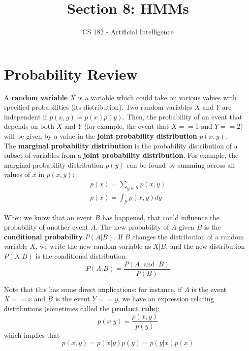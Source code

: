 \documentclass[a4paper]{article}
\title{Section 8: HMMs}
\author{CS 182 - Artificial Intelligence}
\date{}
\begin{document}
\maketitle

\section*{Probability Review}

A {\bf{random variable}} $X$ is a variable which could take on various values with specified probabilities (its distribution). Two random variables $X$ and $Y$ are independent if $p(x, y) = p(x)p(y)$. Then, the probability of an event that depends on both $X$ and $Y$ (for example, the event that $X == 1$ and $Y == 2$) will be given by a value in the {\bf{joint probability distribution}} $p(x, y)$. \\

\noindent The {\bf{marginal probability distribution}} is the probability distribution of a subset of variables from a {\bf{joint probability distribution}}. For example, the marginal probability distribution $p(y)$ can be found by summing across all values of $x$ in $p(x, y)$:
\begin{align*}
p(x) = \sum_{y \in \mathcal{Y}} p(x, y) \\
p(x) = \int_{\mathcal{Y}} p(x,y) dy
\end{align*}

\noindent When we know that an event $B$ has happened, that could influence the probability of another event $A$. The new probability of $A$ given $B$ is the {\bf{conditional probability}} $P(A|B)$. If $B$ changes the distribution of a random variable $X$, we write the new random variable as $X|B$, and the new distribution $P(X|B)$ is the conditional distribution:
$$ P(A | B) = \frac{P(A \;\; \text{and} \;\; B)}{P(B)}$$

\noindent Note that this has some direct implications: for instance, if $A$ is the event $X == x$ and $B$ is the event $Y == y$, we have an expression relating distributions (sometimes called the {\bf{product rule}}):
$$ p(x | y) = \frac{p(x, y)}{p(y)}$$
which implies that
$$ p(x, y) = p(x | y) p(y) = p(y | x) p(x)$$
\end{document}
